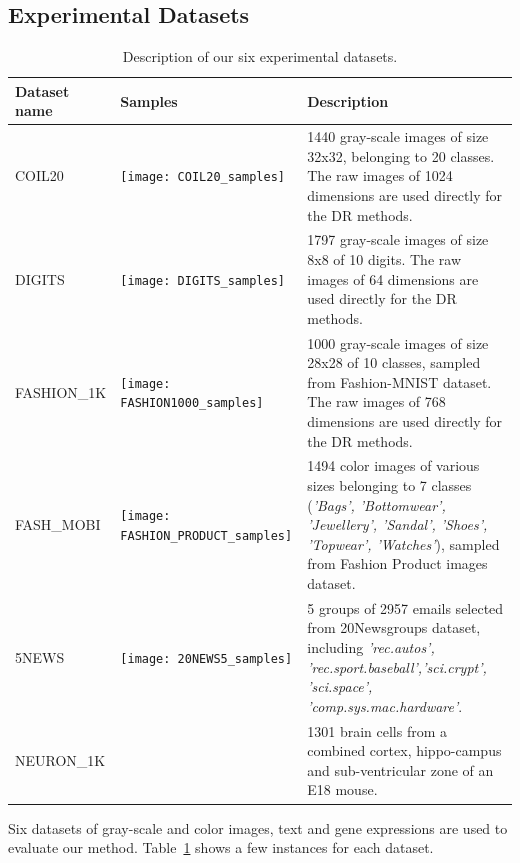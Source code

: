 \subsection{Experimental Datasets}\label{sec:xp:data}

\begin{table}%
\caption{Description of our six experimental datasets.}\label{tbl:dataset}
\begin{tabular}{m{2.2cm} m{5.4cm} m{7.4cm}}
\toprule
Dataset name & Samples & Description \\
\midrule

COIL20
    & \texttt{[image: COIL20\_samples]}
    & 1440 gray-scale images of size 32x32, belonging to 20 classes.
    The raw images of 1024 dimensions are used directly for the DR methods.\\

DIGITS
    & \texttt{[image: DIGITS\_samples]}
    & 1797 gray-scale images of size 8x8 of 10 digits.
    The raw images of 64 dimensions are used directly for the DR methods.\\

{FASHION\_1K}
    & \texttt{[image: FASHION1000\_samples]}
    & 1000 gray-scale images of size 28x28 of 10 classes, sampled from Fashion-MNIST dataset.
    The raw images of 768 dimensions are used directly for the DR methods.\\

{FASH\_MOBI}
    & \texttt{[image: FASHION\_PRODUCT\_samples]}
    & 1494 color images of various sizes belonging to 7 classes
    (\emph{'Bags', 'Bottomwear', 'Jewellery', 'Sandal', 'Shoes', 'Topwear', 'Watches'}),
    sampled from Fashion Product images dataset.\\

5NEWS
    & \texttt{[image: 20NEWS5\_samples]}
    & 5 groups of 2957 emails selected from 20Newsgroups dataset,
    including \emph{'rec.autos', 'rec.sport.baseball','sci.crypt', 'sci.space', 'comp.sys.mac.hardware'}. \\

{NEURON\_1K}
    &
    & 1301 brain cells from a combined cortex, hippo-campus and sub-ventricular zone of an E18 mouse. \\

\bottomrule
\end{tabular}
\end{table}

Six datasets of gray-scale and color images, text and gene expressions are used to evaluate our method. Table~\ref{tbl:dataset} shows a few instances for each dataset.

